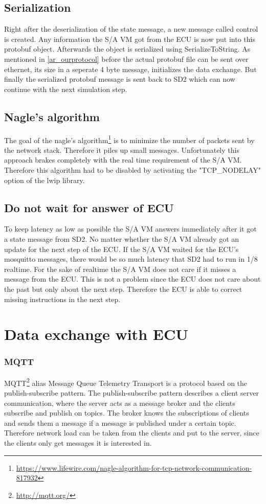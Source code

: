 \documentclass[paper=a4, fontsize=11pt]{scrreprt}
\begin{document}
  \subsection{Serialization}
Right after the deserialization of the state message, a new message called control is created. Any information the S/A VM got from the ECU is now put into this protobuf object. Afterwards the object is serialized using SerializeToString. As mentioned in \ref{ar_ourprotocol} before the actual protobuf file can be sent over ethernet, its size in a seperate 4 byte message, initializes the data exchange. But finally the serialized protobuf message is sent back to SD2 which can now continue with the next simulation step.
  \subsection{Nagle's algorithm}
The goal of the nagle's algorithm\footnote{\url{https://www.lifewire.com/nagle-algorithm-for-tcp-network-communication-817932}} is to minimize the number of packets sent by the network stack. Therefore it piles up small messages. Unfortunately this approach brakes completely with the real time requirement of the S/A VM. Therefore this algorithm had to be disabled by activating the "TCP\_NODELAY" option of the lwip library.
  \subsection{Do not wait for answer of ECU}
To keep latency as low as possible the S/A VM answers immediately after it got a state message from SD2. No matter whether the S/A VM already got an update for the next step of the ECU. If the S/A VM waited for the ECU's mosquitto messages, there would be so much latency that SD2 had to run in 1/8 realtime. For the sake of realtime the S/A VM does not care if it misses a message from the ECU. This is not a problem since the ECU does not care about the past but only about the next step. Therefore the ECU is able to correct missing instructions in the next step.

\section{Data exchange with ECU}
  \subsubsection{MQTT}
MQTT\footnote{\url{http://mqtt.org/}} alias Message Queue Telemetry Transport is a protocol based on the publish-subscribe pattern.\newline
The publish-subscribe pattern describes a client server communication, where the server acts as a message broker and the clients subscribe and publish on topics. The broker knows the subscriptions of clients and sends them a message if a message is published under a certain topic. Therefore network load can be taken from the clients and put to the server, since the clients only get messages it is interested in.
\end{document}
